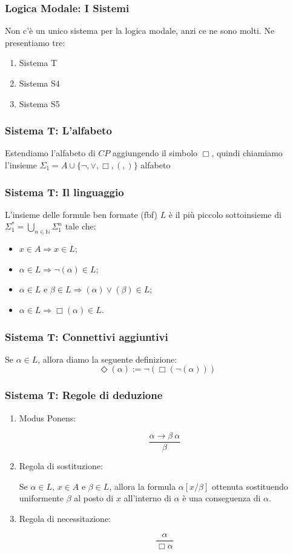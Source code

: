 \documentclass[notheorem,aspectratio=169]{beamer}
\begin{document}
\begin{frame}
\frametitle{Logica Modale: I Sistemi}

Non c'è un unico sistema per la logica modale, anzi ce ne sono molti.
Ne presentiamo tre:
\begin{enumerate}
\item Sistema T
\item Sistema S4
\item Sistema S5
\end{enumerate}
\end{frame}

\begin{frame}
\frametitle{Sistema T: L'alfabeto}
Estendiamo l'alfabeto di $CP$ aggiungendo il simbolo $\Box$, quindi
chiamiamo l'insieme $\Sigma_1 = A \cup \{\neg, \lor, \Box, (, )\}$ alfabeto

\end{frame}

\begin{frame}
\frametitle{Sistema T: Il linguaggio}
L'insieme delle formule ben formate (fbf) $L$ è il più piccolo sottoinsieme di
$\Sigma_1^{*} = \bigcup_{n \in \mathbb{N}} \Sigma_1^n$ tale che:
\begin{itemize}
\item $x \in A \Rightarrow x \in L$;
\item $\alpha \in L \Rightarrow \neg (\alpha) \in L$;
\item $\alpha \in L$ e $\beta \in L \Rightarrow (\alpha) \lor (\beta) \in L$;
\item {\color{red} $\alpha \in L \Rightarrow \Box (\alpha) \in L.$}
\end{itemize}
\end{frame}

\begin{frame}
\frametitle{Sistema T: Connettivi aggiuntivi}
Se $\alpha \in L$, allora diamo la seguente definizione:
$$\Diamond (\alpha) := \neg(\Box(\neg(\alpha)))$$
\end{frame}

\begin{frame}
\frametitle{Sistema T: Regole di deduzione}
\begin{enumerate}
\item Modus Ponens:

$$\frac{\alpha \rightarrow \beta \ \alpha}{\beta}$$

\item Regola di sostituzione:

Se $\alpha \in L$, $x \in A$ e $\beta \in L$, allora
la formula $\alpha[x/\beta]$ ottenuta sostituendo uniformente $\beta$ al posto di $x$
all'interno di $\alpha$ è una conseguenza di $\alpha$.

\item {\color{red} Regola di necessitazione:

$$\frac{\alpha}{\Box \alpha}$$}
\end{enumerate}
\end{frame}
\end{document}
